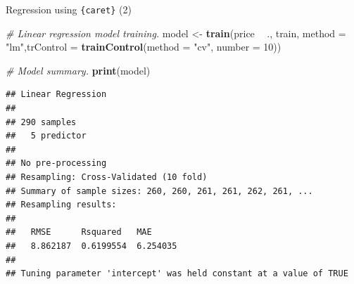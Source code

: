 \documentclass[12pt,ignorenonframetext,]{beamer}
\newenvironment{Shaded}{\begin{snugshade}}{\end{snugshade}}
\newcommand{\CommentTok}[1]{\textcolor[rgb]{0.56,0.35,0.01}{\textit{#1}}}
\newcommand{\DataTypeTok}[1]{\textcolor[rgb]{0.13,0.29,0.53}{#1}}
\newcommand{\DecValTok}[1]{\textcolor[rgb]{0.00,0.00,0.81}{#1}}
\newcommand{\KeywordTok}[1]{\textcolor[rgb]{0.13,0.29,0.53}{\textbf{#1}}}
\newcommand{\NormalTok}[1]{#1}
\newcommand{\OperatorTok}[1]{\textcolor[rgb]{0.81,0.36,0.00}{\textbf{#1}}}
\newcommand{\StringTok}[1]{\textcolor[rgb]{0.31,0.60,0.02}{#1}}
\begin{document}
\begin{frame}[fragile]{Regression using \texttt{\{caret\}} (2)}
\protect\hypertarget{regression-using-2}{}

\tiny

\begin{Shaded}
\begin{Highlighting}[]
\CommentTok{# Linear regression model training.}
\NormalTok{model <-}\StringTok{ }\KeywordTok{train}\NormalTok{(price }\OperatorTok{~}\StringTok{ }\NormalTok{., train, }\DataTypeTok{method =} \StringTok{"lm"}\NormalTok{,}\DataTypeTok{trControl =} \KeywordTok{trainControl}\NormalTok{(}\DataTypeTok{method =} \StringTok{"cv"}\NormalTok{,}
                                        \DataTypeTok{number =} \DecValTok{10}\NormalTok{))}

\CommentTok{# Model summary.}
\KeywordTok{print}\NormalTok{(model)}
\end{Highlighting}
\end{Shaded}

\begin{verbatim}
## Linear Regression 
## 
## 290 samples
##   5 predictor
## 
## No pre-processing
## Resampling: Cross-Validated (10 fold) 
## Summary of sample sizes: 260, 260, 261, 261, 262, 261, ... 
## Resampling results:
## 
##   RMSE      Rsquared   MAE     
##   8.862187  0.6199554  6.254035
## 
## Tuning parameter 'intercept' was held constant at a value of TRUE
\end{verbatim}

\normalsize

\end{frame}
\end{document}
